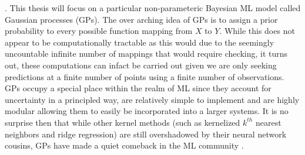 \cite{RasmussenCarlEdward2006Gpfm}. This thesis will focus on a particular non-parameteric Bayesian ML model called Gaussian processes (GPs). The over arching idea of GPs is to assign a prior probability to every possible function mapping from $X$ to $Y$. While this does not appear to be computationally tractable as this would due to the seemingly uncountable infinite number of mappings that would require checking, it turns out, these computations can infact be carried out given we are only seeking predictions at a finite number of points using a finite number of observations. GPs occupy a special place within the realm of ML since they account for uncertainty in a principled way, are relatively simple to implement and are highly modular allowing them to easily be incorporated into a larger systems. It is no surprise then that while other kernel methods (such as kernelized $k^{th}$ nearest neighbors and ridge regression) are still overshadowed by their neural network cousins, GPs have made a quiet comeback in the ML community \cite{cao2018scaling}.

